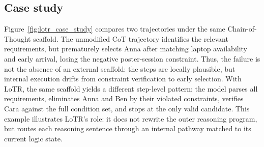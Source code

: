 \vspace{-1mm}
\subsection{Case study}
\label{sec:case_study}
\vspace{-1mm}

Figure~\ref{fig:lotr_case_study} compares two trajectories under the same Chain-of-Thought scaffold.
The unmodified CoT trajectory identifies the relevant requirements, but prematurely selects Anna after matching laptop availability and early arrival, losing the negative poster-session constraint.
Thus, the failure is not the absence of an external scaffold: the steps are locally plausible, but internal execution drifts from constraint verification to early selection.
With LoTR, the same scaffold yields a different step-level pattern: the model parses all requirements, eliminates Anna and Ben by their violated constraints, verifies Cara against the full condition set, and stops at the only valid candidate.
This example illustrates LoTR's role: it does not rewrite the outer reasoning program, but routes each reasoning sentence through an internal pathway matched to its current logic state.
